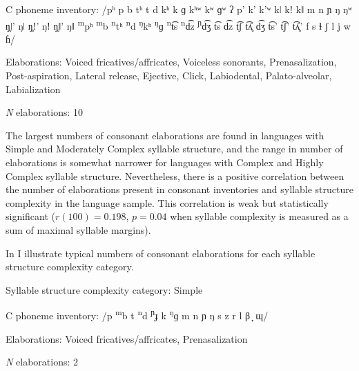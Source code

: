 \ea\label{ex:4.27}
\begin{Coding}
\item[C phoneme inventory:]  /pʰ p b tʰ t d kʰ k ɡ kʰʷ kʷ ɡʷ ʔ p’ k’ k’ʷ kǀ kǃ kǁ m n ɲ ŋ ŋʷ ŋ̥ǀ’ ŋǀ ŋ̥ǃ’ ŋǃ ŋ̥ǁ’ ŋǁ \textsuperscript{m}pʰ \textsuperscript{m}b \textsuperscript{n}tʰ \textsuperscript{n}d \textsuperscript{ŋ}kʰ \textsuperscript{ŋ}ɡ \textsuperscript{n}t͡s \textsuperscript{n}d͡z \textsuperscript{ɲ}d͡ʒ t͡s d͡z t͡ʃ t͡ʎ̥ d͡ʒ t͡s’ t͡ʃ’ t͡ʎ̥’ f s ɬ ʃ l j w ɦ/

\item[Elaborations:] Voiced fricatives/affricates, Voiceless sonorants, Prenasalization, Post-aspiration, Lateral release, Ejective, Click, Labiodental, Palato-alveolar, Labialization

\item[\textit{N} elaborations:] 10
\end{Coding}
\z

  The largest numbers of consonant elaborations are found in languages with Simple and Moderately Complex syllable structure, and the range in number of elaborations is somewhat narrower for languages with Complex and Highly Complex syllable structure. Nevertheless, there is a positive correlation between the number of elaborations present in consonant inventories and syllable structure complexity in the language sample. This correlation is weak but statistically significant ($r(100) = 0.198$, $p = 0.04$ when syllable complexity is measured as a sum of maximal syllable margins).

  In  I illustrate typical numbers of consonant elaborations for each syllable structure complexity category.

\ea\label{ex:4.28}
\begin{Coding}
\item[Syllable structure complexity category:] Simple

\item[C phoneme inventory:] /p \textsuperscript{m}b t \textsuperscript{n}d \textsuperscript{ɲ}ɟ k \textsuperscript{ŋ}ɡ m n ɲ ŋ s z r l β ̞ ɰ/

\item[Elaborations:] Voiced fricatives/affricates, Prenasalization

\item[\textit{N} elaborations:] 2
\end{Coding}
\z

